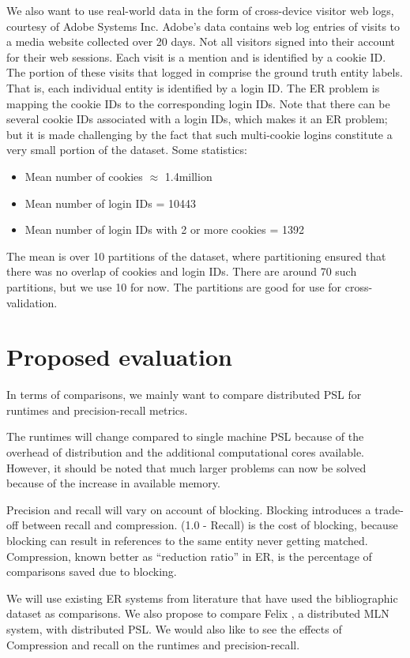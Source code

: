 \documentclass{article}
\begin{document}
We also want to use real-world data in the form of cross-device visitor web logs, courtesy of Adobe Systems Inc. Adobe's data contains web log entries of visits to a media website collected over 20 days. Not all visitors signed into their account for their web sessions. Each visit is a mention and is identified by a cookie ID. The portion of these visits that logged in comprise the ground truth entity labels. That is, each individual entity is identified by a login ID. The ER problem is mapping the cookie IDs to the corresponding login IDs. Note that there can be several cookie IDs associated with a login IDs, which makes it an ER problem; but it is made challenging by the fact that such multi-cookie logins constitute a very small portion of the dataset. Some statistics:
    \begin{itemize}
        \item Mean number of cookies $\approx$ 1.4million
        \item Mean number of login IDs = 10443
        \item Mean number of login IDs with 2 or more cookies = 1392
    \end{itemize}
The mean is over 10 partitions of the dataset, where partitioning ensured that there was no overlap of cookies and login IDs. There are around 70 such partitions, but we use 10 for now. The partitions are good for use for cross-validation. 

\section{Proposed evaluation}

In terms of comparisons, we mainly want to compare distributed PSL for runtimes and precision-recall metrics.

The runtimes will change compared to single machine PSL because of the overhead of distribution and the additional computational cores available. However, it should be noted that much larger problems can now be solved because of the increase in available memory.

Precision and recall will vary on account of blocking. Blocking introduces a trade-off between recall and compression. (1.0 - Recall) is the cost of blocking, because blocking can result in references to the same entity never getting matched. Compression, known better as ``reduction ratio'' in ER, is the percentage of comparisons saved due to blocking. 

We will use existing ER systems from literature that have used the bibliographic dataset as comparisons.
We also propose to compare Felix \cite{niu2011scaling}, a distributed MLN system, with distributed PSL. We would also like to see the effects of Compression and recall on the runtimes and precision-recall.
\end{document}

